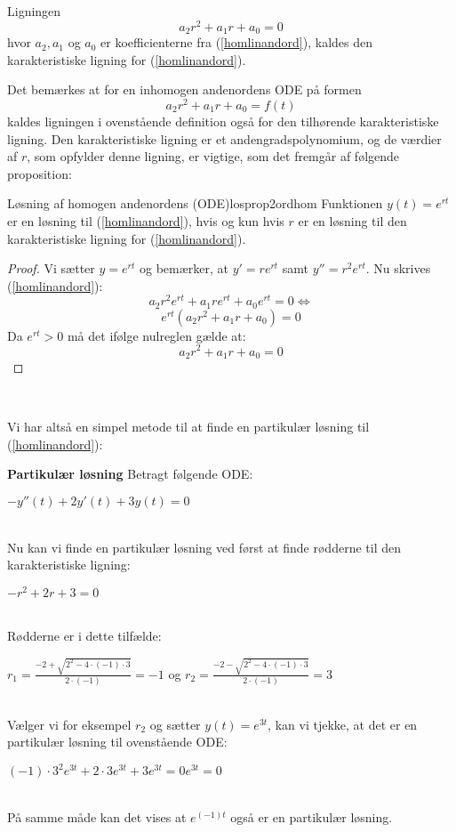 \begin{definition}
Ligningen 
$$a_2r^2+a_1r+a_0=0$$
hvor $a_2, a_1$ og $a_0$ er koefficienterne fra (\ref{homlinandord}), kaldes den karakteristiske ligning for (\ref{homlinandord}).
\end{definition} 
\hfill \break
Det bemærkes at for en inhomogen andenordens ODE på formen
$$a_2r^2+a_1r+a_0=f(t)$$
kaldes ligningen i ovenstående definition også for den tilhørende karakteristiske ligning.
Den  karakteristiske ligning er et andengradspolynomium, og de værdier af $r$, som opfylder denne ligning, er vigtige, som det fremgår af følgende proposition: \hfill \break
\begin{prop}{Løsning af homogen andenordens (ODE)}{losprop2ordhom}\label{losprop2ordhom}
Funktionen $y(t)=e^{rt}$ er en løsning til (\ref{homlinandord}), hvis og kun hvis $r$ er en løsning til den karakteristiske ligning for (\ref{homlinandord}).
\end{prop}
\hfill \break
\begin{proof} \hfill \break
Vi sætter $y=e^{rt}$ og bemærker, at $y'=re^{rt}$ samt $y''=r^2e^{rt}$. Nu skrives (\ref{homlinandord}): \hfill \break
 $$a_2r^2e^{rt}+a_1re^{rt}+a_0e^{rt}=0 \Leftrightarrow$$ 
 $$e^{rt}(a_2r^2+a_1r+a_0)=0$$
 Da $e^{rt}>0$ må det ifølge nulreglen gælde at: \hfill \break
 $$a_2r^2+a_1r+a_0=0$$
\end{proof} \\ 
\hfill \break

Vi har altså en simpel metode til at finde en partikulær løsning til (\ref{homlinandord}):\hfill \break

\begin{Example}\label{ekspartlos} \textbf{Partikulær løsning}\hfill \break
\textnormal{Betragt følgende ODE:}\\ \hfill \break
\centerline{$-y''(t)+2y'(t)+3y(t)=0$}\\ \hfill \break
\textnormal{Nu kan vi finde en partikulær løsning ved først at finde rødderne til den karakteristiske ligning:}\\ \hfill \break
\centerline{$-r^2+2r+3=0$}\\ \hfill \break
\textnormal{Rødderne er i dette tilfælde:}\\ \hfill \break
\centerline{$r_1=\frac{-2+\sqrt{2^2-4\cdot (-1)\cdot 3}}{2\cdot (-1)}=-1$ \textnormal{og} $r_2=\frac{-2-\sqrt{2^2-4\cdot (-1)\cdot 3}}{2\cdot (-1)}=3$} \\ \hfill \break
\textnormal{Vælger vi for eksempel $r_2$ og sætter $y(t)=e^{3t}$, kan vi tjekke, at det er en partikulær løsning til ovenstående ODE:}\\ \hfill \break
\centerline{$(-1)\cdot3^2e^{3t}+2\cdot 3e^{3t}+3e^{3t}=0e^{3t}=0$}\\ \hfill \break
\textnormal{På samme måde kan det vises at $e^{(-1)t}$ også er en partikulær løsning.}
\end{Example}\hfill \break

